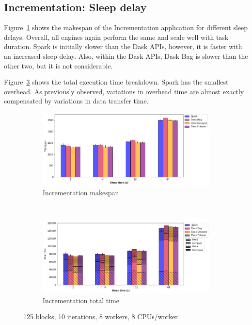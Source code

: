 \documentclass[conference]{IEEEtran}
\begin{document}
\subsection{Incrementation: Sleep delay}
Figure~\ref{fig:inc_ms_sleep} shows the makespan of the Incrementation application
for different sleep delays. Overall, all engines again perform the same and scale
well with task duration. Spark is initially slower than the Dask APIs, however, it is
faster with an increased sleep delay. Also, within the Dask APIs, Dask Bag is
slower than the other two, but it is not considerable.

Figure~\ref{fig:inc_tt_sleep} shows the total execution time breakdown. Spark has the
smallest overhead. As previously observed, variations in overhead time are almost
exactly compensated by variations in data transfer time.

\begin{figure}[!b]
    \centering
    \begin{subfigure}[b]{\columnwidth}
        \includegraphics[clip,width=\columnwidth]{images/inc_sleep.png}%
        \caption{Incrementation makespan}\label{fig:inc_ms_sleep}
    \end{subfigure}
    \\
    \begin{subfigure}[b]{\columnwidth}
        \includegraphics[clip,width=\columnwidth]{images/inc_idle_sleep.png}%
        \caption{Incrementation total time}\label{fig:inc_tt_sleep}
    \end{subfigure}
    \caption{125 blocks, 10 iterations, 8 workers, 8 CPUs/worker}
\end{figure}
\end{document}
